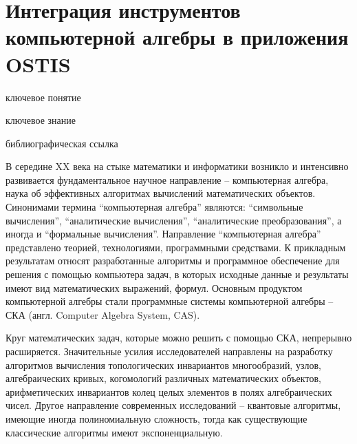 \newpage

\section{Интеграция инструментов компьютерной алгебры в приложения OSTIS}
{\label{sec_integration_algebra}} 

\begin{SCn}

 \bigskip
 
 \begin{scnrelfromlist}{ключевое понятие}
 \end{scnrelfromlist}
 
 \bigskip
 
 \begin{scnrelfromlist}{ключевое знание}
 \end{scnrelfromlist}
 
 \bigskip
 
 \begin{scnrelfromlist}{библиографическая ссылка}
 \end{scnrelfromlist}
 
 \end{SCn}

В середине XX века на стыке математики и информатики возникло и интенсивно развивается фундаментальное научное направление -- компьютерная алгебра, наука об эффективных алгоритмах вычислений математических объектов. Синонимами термина ``компьютерная алгебра'' являются: ``символьные вычисления'', ``аналитические вычисления'', ``аналитические преобразования'', а иногда и ``формальные вычисления''. Направление ``компьютерная алгебра'' представлено теорией, технологиями, программными средствами. К прикладным результатам относят разработанные алгоритмы и программное обеспечение для решения с помощью компьютера задач, в которых исходные данные и результаты имеют вид математических выражений, формул. Основным продуктом компьютерной алгебры стали программные системы компьютерной алгебры -- СКА (англ. Computer Algebra System, CAS). 

Круг математических задач, которые можно решить с помощью СКА, непрерывно расширяется. Значительные усилия исследователей направлены на разработку алгоритмов вычисления топологических инвариантов многообразий, узлов, алгебраических кривых, когомологий различных математических объектов, арифметических инвариантов колец целых элементов в полях алгебраических чисел. Другое направление современных исследований -- квантовые алгоритмы, имеющие иногда полиномиальную сложность, тогда как существующие классические алгоритмы имеют экспоненциальную.

